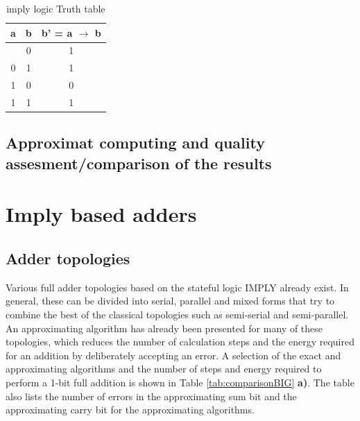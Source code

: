 \documentclass[]{IEEEtran}
\begin{document}
\begin{table}[h]
\centering
\begin{tabular}{|c|c|c|}
\hline
a & b & b' = a $\rightarrow$ b \\ \hline
\addlinespace[1ex] \hline
0 & 0 & 1                                  \\ \hline
0 & 1 & 1                                  \\ \hline
1 & 0 & 0                                  \\ \hline
1 & 1 & 1                                  \\ \hline
\end{tabular}
\caption{\gls{imply} logic Truth table \cite{10032497}}
\label{tab:ImplyLogicTT}
\end{table}

\subsection{Approximat computing and quality assesment/comparison of the results}
\section{Imply based adders}
\label{ch:exactImplyAdders}
\subsection{Adder topologies}
Various full adder topologies based on the stateful logic IMPLY already exist. In general, these can be divided into serial, parallel and mixed forms that try to combine the best of the classical topologies such as semi-serial and semi-parallel. An approximating algorithm has already been presented for many of these topologies, which reduces the number of calculation steps and the energy required for an addition by deliberately accepting an error.
A selection of the exact and approximating algorithms and the number of steps and energy required to perform a 1-bit full addition is shown in Table \ref{tab:comparisonBIG} \textbf{a)}. The table also lists the number of errors in the approximating sum bit and the approximating carry bit for the approximating algorithms.
\end{document}
